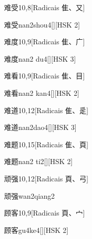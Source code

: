 \begin{entry}{难受}{10,8}[Radicais ⾫、⼜]
  \begin{phonetics}{难受}{nan2shou4}[][HSK 2]
  \end{phonetics}
\end{entry}

\begin{entry}{难度}{10,9}[Radicais ⾫、⼴]
  \begin{phonetics}{难度}{nan2 du4}[][HSK 3]
  \end{phonetics}
\end{entry}

\begin{entry}{难看}{10,9}[Radicais ⾫、⽬]
  \begin{phonetics}{难看}{nan2 kan4}[][HSK 2]
  \end{phonetics}
\end{entry}

\begin{entry}{难道}{10,12}[Radicais ⾫、⾡]
  \begin{phonetics}{难道}{nan2dao4}[][HSK 3]
  \end{phonetics}
\end{entry}

\begin{entry}{难题}{10,15}[Radicais ⾫、⾴]
  \begin{phonetics}{难题}{nan2 ti2}[][HSK 2]
  \end{phonetics}
\end{entry}

\begin{entry}{顽强}{10,12}[Radicais ⾴、⼸]
  \begin{phonetics}{顽强}{wan2qiang2}
  \end{phonetics}
\end{entry}

\begin{entry}{顾客}{10,9}[Radicais ⾴、⼧]
  \begin{phonetics}{顾客}{gu4ke4}[][HSK 2]
  \end{phonetics}
\end{entry}

